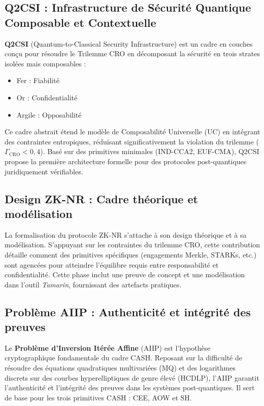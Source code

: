\documentclass[12pt]{article}
\begin{document}
\begin{center}
\subsection{Q2CSI : Infrastructure de Sécurité Quantique Composable et Contextuelle}
\textbf{Q2CSI} (Quantum-to-Classical Security Infrastructure) est un cadre en couches conçu pour résoudre le Trilemme CRO en décomposant la sécurité en trois strates isolées mais composables :
\begin{itemize}[leftmargin=*, label=\textbullet]
    \item Fer : Fiabilité
    \item Or : Confidentialité
    \item Argile : Opposabilité
\end{itemize}
Ce cadre abstrait étend le modèle de Composabilité Universelle (UC) en intégrant des contraintes entropiques, réduisant significativement la violation du trilemme (\(\Gamma_{\text{CRO}} < 0,4\)). Basé sur des primitives minimales (IND-CCA2, EUF-CMA), Q2CSI propose la première architecture formelle pour des protocoles post-quantiques juridiquement vérifiables.

\subsection{Design ZK-NR : Cadre théorique et modélisation}
La formalisation du protocole ZK-NR s’attache à son design théorique et à sa modélisation. S’appuyant sur les contraintes du trilemme CRO, cette contribution détaille comment des primitives spécifiques (engagements Merkle, STARKs, etc.) sont agencées pour atteindre l’équilibre requis entre responsabilité et confidentialité. Cette phase inclut une preuve de concept et une modélisation dans l’outil \textit{Tamarin}, fournissant des artefacts pratiques.

\subsection{Problème AIIP : Authenticité et intégrité des preuves}
Le \textbf{Problème d’Inversion Itérée Affine} (AIIP) est l’hypothèse cryptographique fondamentale du cadre CASH. Reposant sur la difficulté de résoudre des équations quadratiques multivariées (MQ) et des logarithmes discrets sur des courbes hyperelliptiques de genre élevé (HCDLP), l’AIIP garantit l’authenticité et l’intégrité des preuves dans les systèmes post-quantiques. Il sert de base pour les trois primitives CASH : CEE, AOW et SH.


\end{center}
\end{document}
